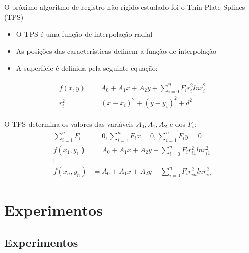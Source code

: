 \documentclass[t]{beamer}
\begin{document}
\begin{frame}
  O próximo algoritmo de registro não-rígido estudado foi o Thin Plate Splines (TPS) \cite{goshtasby2005}
  \begin{itemize}
    \item O TPS é uma função de interpolação radial
    \item As posições das características definem a função de interpolação
    \item A superfície é definida pela seguinte equação\cite{bookstein1989principal}:
  \end{itemize}
  \begin{align}
  \begin{split}
      f(x,y) &= A_0 + A_1x + A_2y + \sum_{i=0}^n F_i r_i^2 ln r_i^2 \\
      r_i^2 &= (x-x_i)^2 + (y-y_i)^2 + d^2
  \end{split}    
  \end{align}
\end{frame}

\begin{frame}
  O TPS determina os valores das variáveis $A_0, A_1, A_2$ e dos $F_i$:
  \begin{align}
  \begin{split}
      \sum_{i=1}^n F_i &= 0, \sum_{i=1}^n F_ix = 0, \sum_{i=1}^n F_iy = 0 \\
      f(x_1,y_1) &= A_0 + A_1x + A_2y + \sum_{i=0}^n F_i r_{i1}^2 ln r_{i1}^2 \\
      \vdots \\
      f(x_n,y_n) &= A_0 + A_1x + A_2y + \sum_{i=0}^n F_i r_{in}^2 ln r_{in}^2
  \end{split}
  \end{align}
\end{frame}

\section{Experimentos}
\subsection{Experimentos}
\end{document}
